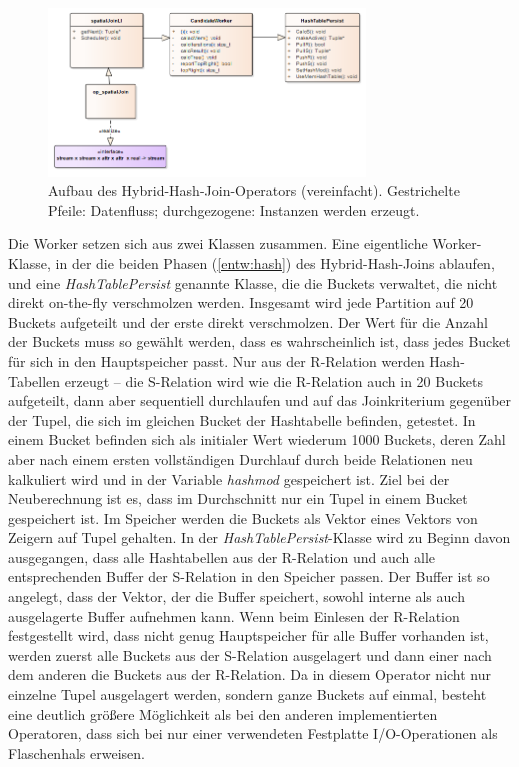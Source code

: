 \documentclass[a4paper,12pt,twoside]{article}
\newcommand{\Fb}[1]{\textit{#1}} %
\begin{document}
\begin{figure}
	\centering
	\includegraphics[width=0.75\textwidth]{Bilder/hybridJoin.png}
	\caption{Aufbau des Hybrid-Hash-Join-Operators (vereinfacht). Gestrichelte Pfeile: Datenfluss; durchgezogene: Instanzen werden erzeugt.}
	\label{img:KlassJoin}
\end{figure}


Die Worker setzen sich aus zwei Klassen zusammen. Eine eigentliche Worker-Klasse, in der die beiden Phasen (\autoref{entw:hash}) des Hybrid-Hash-Joins ablaufen, und eine \Fb{HashTablePersist} genannte Klasse, die die Buckets verwaltet, die nicht direkt on-the-fly verschmolzen werden. Insgesamt wird jede Partition auf 20 Buckets aufgeteilt und der erste direkt verschmolzen. Der Wert für die Anzahl der Buckets muss so gewählt werden, dass es wahrscheinlich ist, dass jedes Bucket für sich in den Hauptspeicher passt. Nur aus der R-Relation werden Hash-Tabellen erzeugt -- die S-Relation wird wie die R-Relation auch in 20 Buckets aufgeteilt, dann aber sequentiell durchlaufen und auf das Joinkriterium gegenüber der Tupel, die sich im gleichen Bucket der Hashtabelle befinden, getestet. In einem Bucket befinden sich als initialer Wert wiederum 1000 Buckets, deren Zahl aber nach einem ersten vollständigen Durchlauf durch beide Relationen neu kalkuliert wird und in der Variable \Fb{hashmod} gespeichert ist. Ziel bei der Neuberechnung ist es, dass im Durchschnitt nur ein Tupel in einem Bucket gespeichert ist. Im Speicher werden die Buckets als Vektor eines Vektors von Zeigern auf Tupel gehalten. In der \Fb{HashTablePersist}-Klasse wird zu Beginn davon ausgegangen, dass alle Hashtabellen aus der R-Relation und auch alle entsprechenden Buffer der S-Relation in den Speicher passen. Der Buffer ist so angelegt, dass der Vektor, der die Buffer speichert, sowohl interne als auch ausgelagerte Buffer aufnehmen kann. Wenn beim Einlesen der R-Relation festgestellt wird, dass nicht genug Hauptspeicher für alle Buffer vorhanden ist, werden zuerst alle Buckets aus der S-Relation ausgelagert und dann einer nach dem anderen die Buckets aus der R-Relation. Da in diesem Operator nicht nur einzelne Tupel ausgelagert werden, sondern ganze Buckets auf einmal, besteht eine deutlich größere Möglichkeit als bei den anderen implementierten Operatoren, dass sich bei nur einer verwendeten Festplatte I/O-Operationen als Flaschenhals erweisen. 
\end{document}
